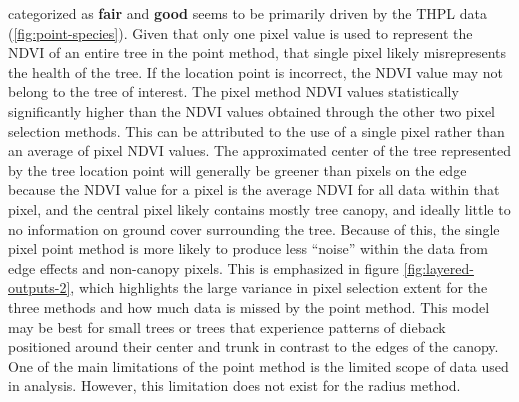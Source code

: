 \documentclass[12pt,twoside]{reedthesis}
\begin{document}
categorized as \textbf{fair} and \textbf{good} seems to be primarily driven by the
THPL data (\ref{fig:point-species}). Given that only one pixel value is
used to represent the NDVI of an entire tree in the point method, that
single pixel likely misrepresents the health of the tree. If the
location point is incorrect, the NDVI value may not belong to the tree
of interest. The pixel method NDVI values statistically significantly
higher than the NDVI values obtained through the other two pixel
selection methods. This can be attributed to the use of a single pixel
rather than an average of pixel NDVI values. The approximated center of
the tree represented by the tree location point will generally be
greener than pixels on the edge because the NDVI value for a pixel is
the average NDVI for all data within that pixel, and the central pixel
likely contains mostly tree canopy, and ideally little to no information
on ground cover surrounding the tree. Because of this, the single pixel
point method is more likely to produce less ``noise'' within the data from
edge effects and non-canopy pixels. This is emphasized in figure
\ref{fig:layered-outputs-2}, which highlights the large variance in
pixel selection extent for the three methods and how much data is missed
by the point method. This model may be best for small trees or trees
that experience patterns of dieback positioned around their center and
trunk in contrast to the edges of the canopy. One of the main
limitations of the point method is the limited scope of data used in
analysis. However, this limitation does not exist for the radius method.
\end{document}
